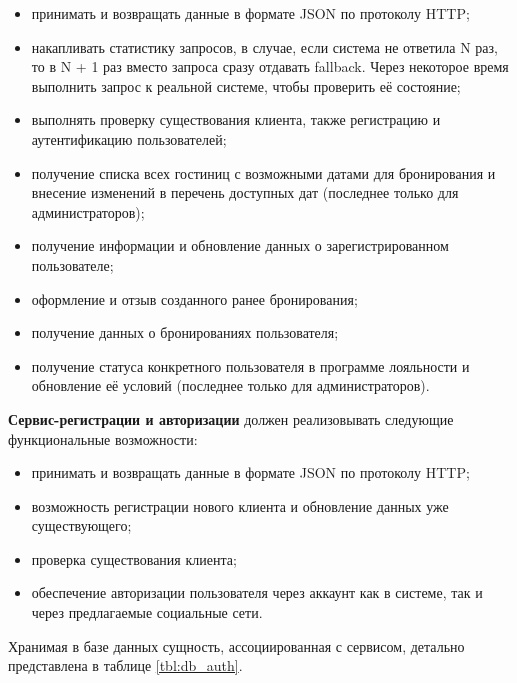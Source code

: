 \begin{itemize}
	\item принимать и возвращать данные в формате JSON по протоколу HTTP;
	
	\item накапливать статистику запросов, в случае, если система не ответила N раз, то в N + 1 раз вместо запроса сразу отдавать fallback. Через некоторое время выполнить запрос к реальной системе, чтобы проверить её состояние;
	
	\item выполнять проверку существования клиента, также регистрацию и аутентификацию пользователей;
	
	\item получение списка всех гостиниц с возможными датами для бронирования и внесение изменений в перечень доступных дат (последнее только для администраторов);
	
	\item получение информации и обновление данных о зарегистрированном пользователе;
	
	\item оформление и отзыв созданного ранее бронирования;
		
	\item получение данных о бронированиях пользователя;
	
	\item получение статуса конкретного пользователя в программе лояльности и обновление её условий (последнее только для администраторов).
\end{itemize}
\textbf{Сервис-регистрации и авторизации} должен реализовывать следующие функциональные возможности:
\begin{itemize}
	\item принимать и возвращать данные в формате JSON по протоколу HTTP;
	
	\item возможность регистрации нового клиента и обновление данных уже существующего;
	
	\item проверка существования клиента;
	
	\item обеспечение авторизации пользователя через аккаунт как в системе, так и через предлагаемые социальные сети.
\end{itemize}
%
Хранимая в базе данных сущность, ассоциированная с сервисом, детально представлена в таблице \ref{tbl:db_auth}.
